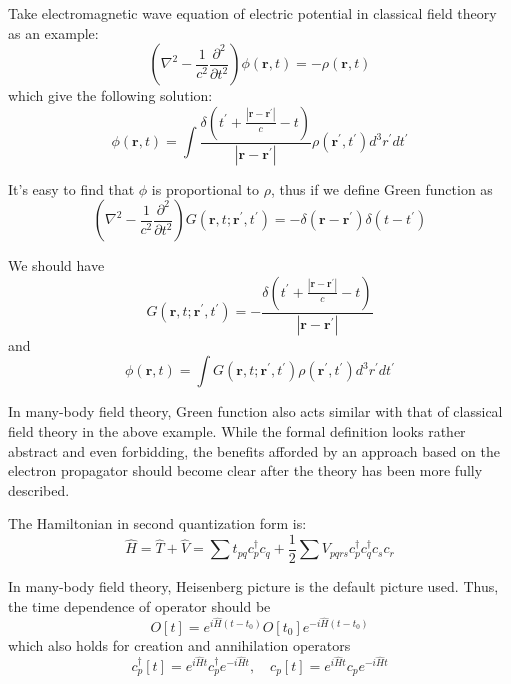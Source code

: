 Take electromagnetic wave equation of electric potential in classical field theory as an example:
\begin{equation}
\left(\nabla^{2}-\frac{1}{c^2}\frac{\partial^{2}}{\partial t^{2}}\right) \phi(\mathbf{r},t)=-\rho(\mathbf{r},t)
\end{equation}
which give the following solution:
\begin{equation}
\phi(\mathbf{r}, t)=\int \frac{\delta\left(t^{\prime}+\frac{|\mathbf{r}-\mathbf{r}^{\prime}|}{c}-t\right)}{|\mathbf{r}-\mathbf{r}^{\prime}|} \rho\left(\mathbf{r}^{\prime}, t^{\prime}\right) d^{3} r^{\prime} d t^{\prime}
\end{equation}

It's easy to find that $\phi$ is proportional to $\rho$, thus if we define Green function as
\begin{equation}
\left(\nabla^{2}-\frac{1}{c^2}\frac{\partial^{2}}{\partial t^{2}}\right) G(\mathbf{r},t;\mathbf{r^{\prime}},t^{\prime})=-\delta(\mathbf{r}-\mathbf{r^\prime})\delta(t-t^{\prime})
\end{equation}

We should have
\begin{equation}
G(\mathbf{r},t;\mathbf{r^{\prime}},t^{\prime})=
-\frac{\delta\left(t^{\prime}+\frac{|\mathbf{r}-\mathbf{r}^{\prime}|}{c}-t\right)}{|\mathbf{r}-\mathbf{r}^{\prime}|}
\end{equation}
and
\begin{equation}
\phi(\mathbf{r}, t)=
\int G(\mathbf{r},t;\mathbf{r^{\prime}},t^{\prime}) \rho\left(\mathbf{r}^{\prime}, t^{\prime}\right) d^{3} r^{\prime} d t^{\prime}
\end{equation}

In many-body field theory, Green function also acts similar with that of classical field theory in the above example.
While the formal definition looks rather abstract and even forbidding, the benefits afforded by an approach based on the electron propagator should become clear after the theory has been more fully described.

The Hamiltonian in second quantization form is:
\begin{equation}
\hat{H}=\hat{T}+\hat{V}=\sum t_{p q} c_{p}^{\dagger} c_{q}+\frac{1}{2} \sum V_{p q r s} c_{p}^{\dagger} c_{q}^{\dagger} c_{s} c_{r}
\end{equation}

In many-body field theory, Heisenberg picture is the default picture used.
Thus, the time dependence of operator should be
\begin{equation}
O[t]=e^{i \hat{H} (t-t_0)} O[t_0] e^{-i \hat{H} (t-t_0)}
\end{equation}
which also holds for creation and annihilation operators
\begin{equation}
c_{p}^{\dagger}[t]=e^{i \hat{H} t} c_{p}^{\dagger} e^{-i \hat{H} t}, \quad c_{p}[t]=e^{i \hat{H} t} c_{p} e^{-i \hat{H} t}
\end{equation}

